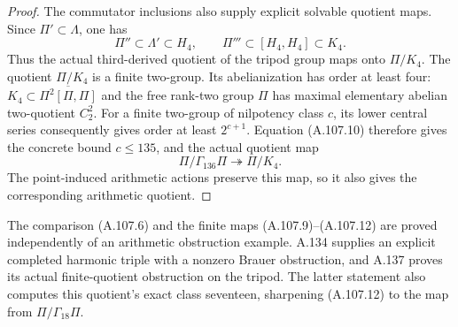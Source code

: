 \begin{proof}
The commutator inclusions also supply explicit
solvable quotient maps.  Since $\Pi'\subset\Lambda$,
one has
\[
 \Pi''\subset\Lambda'\subset H_4,\qquad
                  \Pi'''\subset[H_4,H_4]\subset K_4.
 \tag{A.107.11}
\]
Thus the actual third-derived quotient of the
tripod group maps onto $\Pi/K_4$.
The quotient $\Pi/K_4$ is a finite two-group.
Its abelianization has order at least four:
$K_4\subset\overline{\Pi^2[\Pi,\Pi]}$ and the
free rank-two group $\Pi$ has maximal elementary
abelian two-quotient $C_2^2$.
For a finite two-group of nilpotency class $c$,
its lower central series consequently gives order
at least $2^{c+1}$.
Equation (A.107.10) therefore gives the concrete bound
$c\le135$, and the actual quotient map
\[
                         \Pi/\Gamma_{136}\Pi
                                     \twoheadrightarrow\Pi/K_4.
 \tag{A.107.12}
\]
The point-induced arithmetic actions preserve this
map, so it also gives the corresponding arithmetic
quotient.
\end{proof}

The comparison (A.107.6) and the finite maps
(A.107.9)--(A.107.12) are proved independently of an
arithmetic obstruction example.
A.134 supplies an explicit completed harmonic triple
with a nonzero Brauer obstruction, and A.137 proves
its actual finite-quotient obstruction on the tripod.
The latter statement also computes this quotient's
exact class seventeen, sharpening (A.107.12) to the
map from $\Pi/\Gamma_{18}\Pi$.
